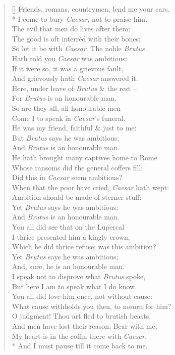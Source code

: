 \documentclass[MAIN]{subfiles}
\begin{document}
\begin{verse}[\versewidth]
Friends, romans, countrymen, lend me your ears.\\*
I come to bury \emph{Caesar}, not to praise him.\\
The evil that men do lives after them;\\
The good is oft interr\`ed with their bones;\\
So let it be with \emph{Caesar}. The noble \emph{Brutus}\\
Hath told you \emph{Caesar} was ambitious:\\
If it were so, it was a grievous fault,\\
And grievously hath \emph{Caesar} answered it.\\
Here, under leave of \emph{Brutus} \& the rest --\\
For \emph{Brutus} is an honourable man,\\
So are they all, all honourable men --\\
Come I to speak in \emph{Caesar}'s funeral.\\
He was my friend, faithful \& just to me:\\
But \emph{Brutus} says he was ambitious;\\
And \emph{Brutus} is an honourable man.\\
He hath brought many captives home to {\sc Rome}\\
Whose ransoms did the general coffers fill:\\
Did this in \emph{Caesar} seem ambitious?\\
When that the poor have cried, \emph{Caesar} hath wept:\\
Ambition should be made of sterner stuff:\\
Yet \emph{Brutus} says he was ambitious;\\
And \emph{Brutus} is an honourable man.\\
You all did see that on the Lupercal\\
I thrice presented him a kingly crown,\\
Which he did thrice refuse: was this ambition?\\
Yet \emph{Brutus} says he was ambitious;\\
And, sure, he is an honourable man.\\
I speak not to disprove what \emph{Brutus} spoke,\\
But here I am to speak what I do know.\\
You all did love him once, not without cause:\\
What cause withholds you then, to mourn for him?\\
O judgment! Thou art fled to brutish beasts,\\
And men have lost their reason. Bear with me;\\
My heart is in the coffin there with \emph{Caesar},\\*
And I must pause till it come back to me.
\end{verse}
\end{document}
